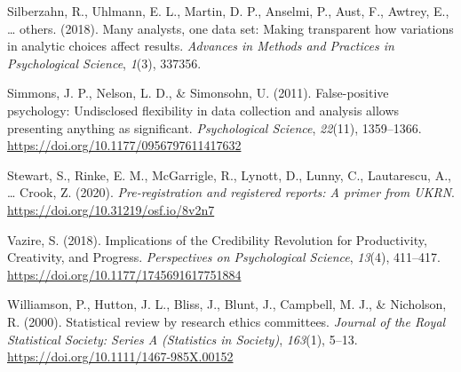 \documentclass[
  man]{apa6}
\newlength{\cslhangindent}
\newlength{\cslentryspacingunit} %
\newenvironment{CSLReferences}[2] %
 {%
  \setlength{\parindent}{0pt}
  \ifodd #1
  \let\oldpar\par
  \def\par{\hangindent=\cslhangindent\oldpar}
  \fi
  \setlength{\parskip}{#2\cslentryspacingunit}
 }%
 {}
\begin{document}
\begin{CSLReferences}{1}{0}
\leavevmode{}%
Silberzahn, R., Uhlmann, E. L., Martin, D. P., Anselmi, P., Aust, F., Awtrey, E., \ldots{} others. (2018). Many analysts, one data set: Making transparent how variations in analytic choices affect results. \emph{Advances in Methods and Practices in Psychological Science}, \emph{1}(3), 337356.

\leavevmode{}%
Simmons, J. P., Nelson, L. D., \& Simonsohn, U. (2011). False-positive psychology: Undisclosed flexibility in data collection and analysis allows presenting anything as significant. \emph{Psychological Science}, \emph{22}(11), 1359--1366. \url{https://doi.org/10.1177/0956797611417632}

\leavevmode{}%
Stewart, S., Rinke, E. M., McGarrigle, R., Lynott, D., Lunny, C., Lautarescu, A., \ldots{} Crook, Z. (2020). \emph{Pre-registration and registered reports: A primer from UKRN}. \url{https://doi.org/10.31219/osf.io/8v2n7}

\leavevmode{}%
Vazire, S. (2018). Implications of the Credibility Revolution for Productivity, Creativity, and Progress. \emph{Perspectives on Psychological Science}, \emph{13}(4), 411--417. \url{https://doi.org/10.1177/1745691617751884}

\leavevmode{}%
Williamson, P., Hutton, J. L., Bliss, J., Blunt, J., Campbell, M. J., \& Nicholson, R. (2000). Statistical review by research ethics committees. \emph{Journal of the Royal Statistical Society: Series A (Statistics in Society)}, \emph{163}(1), 5--13. \url{https://doi.org/10.1111/1467-985X.00152}

\end{CSLReferences}

\endgroup
\end{document}
